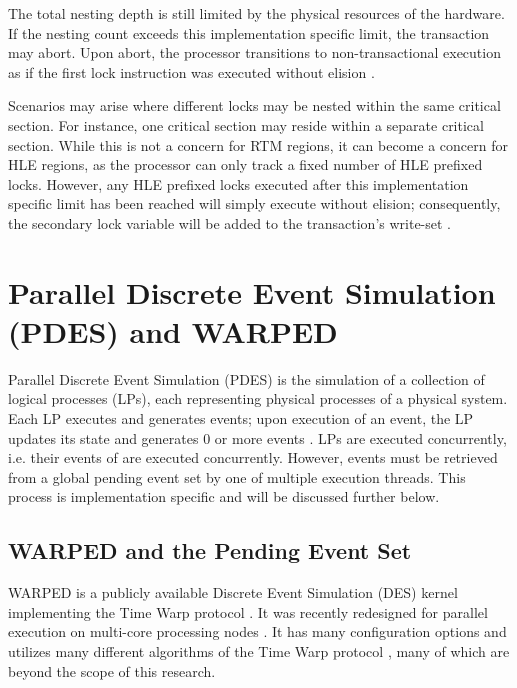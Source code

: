\documentclass[a4paper]{article}
\begin{document}
\indent
The total nesting depth is still limited by the physical resources of
the hardware.  If the nesting count exceeds this implementation specific limit,
the transaction may abort.  Upon abort, the processor transitions to
non-transactional execution as if the first lock instruction was executed
without elision \cite{intel_prog_ref}.
\par

\indent
Scenarios may arise where different locks may be nested within the same
critical section.  For instance, one critical section may reside within a
separate critical section.  While this is not a concern for RTM regions, it can
become a concern for HLE regions, as the processor can only track a fixed number
of HLE prefixed locks.  However, any HLE prefixed locks executed after this
implementation specific limit has been reached will simply execute without
elision; consequently, the secondary lock variable will be added to the
transaction's write-set \cite{intel_prog_ref}.
\par

\newpage
\section{\textbf{Parallel Discrete Event Simulation (PDES) and WARPED}}

\indent
Parallel Discrete Event Simulation (PDES) is the simulation of a collection of
logical processes (LPs), each representing physical processes of a physical
system.  Each LP executes and generates events; upon execution of an event, the
LP updates its state and generates 0 or more events \cite{muthalagu}.  LPs are
executed concurrently, i.e. their events of are executed concurrently.  However,
events must be retrieved from a global pending event set by one of multiple
execution threads.  This process is implementation specific and will be
discussed further below.
\par

\subsection{\textbf{WARPED and the Pending Event Set}}

\indent
WARPED is a publicly available Discrete Event Simulation (DES) kernel
implementing the Time Warp protocol \cite{martin,fujimoto}.  It was recently
redesigned for parallel execution on multi-core processing nodes
\cite{muthalagu}.  It has many configuration options and utilizes many different
algorithms of the Time Warp protocol \cite{fujimoto}, many of which are beyond
the scope of this research.
\par
\end{document}
